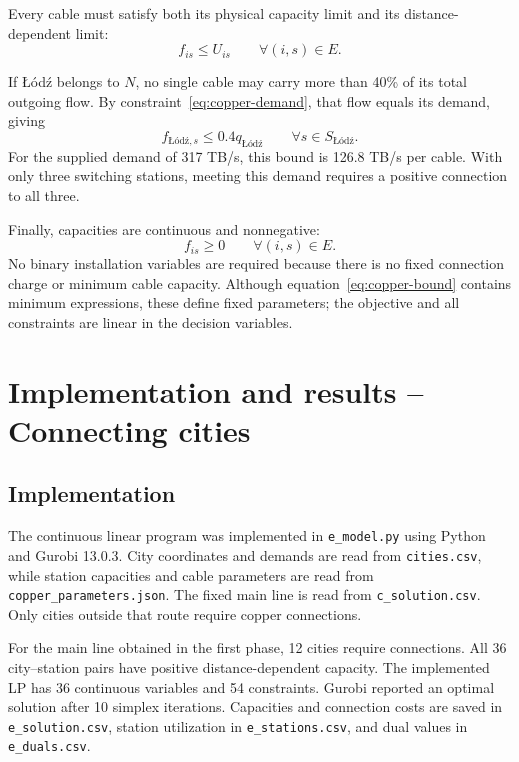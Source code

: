 \documentclass[11pt,a4paper]{article}
\begin{document}
Every cable must satisfy both its physical capacity limit and its distance-dependent limit:
\begin{equation}
f_{is}\le U_{is}
\qquad\forall(i,s)\in E.
\label{eq:copper-capacity}
\end{equation}

If Łódź belongs to $N$, no single cable may carry more than 40\% of its total outgoing flow. By constraint~\eqref{eq:copper-demand}, that flow equals its demand, giving
\begin{equation}
f_{\text{Łódź},s}\le0.4q_{\text{Łódź}}
\qquad\forall s\in S_{\text{Łódź}}.
\label{eq:copper-lodz}
\end{equation}
For the supplied demand of 317 TB/s, this bound is 126.8 TB/s per cable. With only three switching stations, meeting this demand requires a positive connection to all three.

Finally, capacities are continuous and nonnegative:
\begin{equation}
f_{is}\ge0\qquad\forall(i,s)\in E.
\end{equation}
No binary installation variables are required because there is no fixed connection charge or minimum cable capacity. Although equation~\eqref{eq:copper-bound} contains minimum expressions, these define fixed parameters; the objective and all constraints are linear in the decision variables.

\section{Implementation and results -- Connecting cities}
\label{sec:copper-results}
\subsection{Implementation}
The continuous linear program was implemented in \texttt{e\_model.py} using Python and Gurobi 13.0.3. City coordinates and demands are read from \texttt{cities.csv}, while station capacities and cable parameters are read from \texttt{copper\_parameters.json}. The fixed main line is read from \texttt{c\_solution.csv}. Only cities outside that route require copper connections.

For the main line obtained in the first phase, 12 cities require connections. All 36 city--station pairs have positive distance-dependent capacity. The implemented LP has 36 continuous variables and 54 constraints. Gurobi reported an optimal solution after 10 simplex iterations. Capacities and connection costs are saved in \texttt{e\_solution.csv}, station utilization in \texttt{e\_stations.csv}, and dual values in \texttt{e\_duals.csv}.
\end{document}
